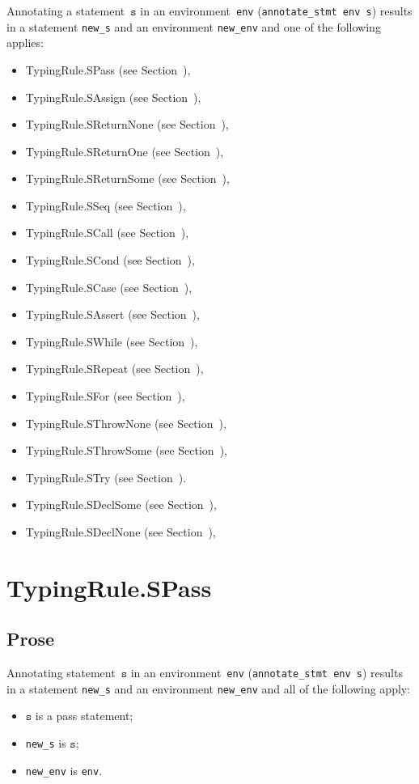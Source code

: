\documentclass{book}
\newcommand\vs[0]{\texttt{s}}
\begin{document}
\begin{itemize}
Annotating a statement~$\vs$ in an environment~\texttt{env}
(\texttt{annotate\_stmt env s}) results in a statement \texttt{new\_s} and an
environment \texttt{new\_env} and one of the following applies:
\begin{itemize}
\item TypingRule.SPass (see Section~),
\item TypingRule.SAssign (see Section~),
\item TypingRule.SReturnNone (see Section~),
\item TypingRule.SReturnOne (see Section~),
\item TypingRule.SReturnSome (see Section~),
\item TypingRule.SSeq (see Section~),
\item TypingRule.SCall (see Section~),
\item TypingRule.SCond (see Section~),
\item TypingRule.SCase (see Section~),
\item TypingRule.SAssert (see Section~),
\item TypingRule.SWhile (see Section~),
\item TypingRule.SRepeat (see Section~),
\item TypingRule.SFor (see Section~),
\item TypingRule.SThrowNone (see Section~),
\item TypingRule.SThrowSome (see Section~),
\item TypingRule.STry (see Section~).
\item TypingRule.SDeclSome (see Section~),
\item TypingRule.SDeclNone (see Section~),
\end{itemize}

\section{TypingRule.SPass \label{sec:TypingRule.SPass}}

    \subsection{Prose}
Annotating statement~$\vs$ in an environment~\texttt{env}
(\texttt{annotate\_stmt env s}) results in a statement \texttt{new\_s} and an
environment \texttt{new\_env} and all of the following apply:
    \begin{itemize}
    \item $\vs$ is a pass statement;
    \item \texttt{new\_s} is $\vs$;
    \item \texttt{new\_env} is \texttt{env}.
    \end{itemize}


\end{itemize}
\end{document}
